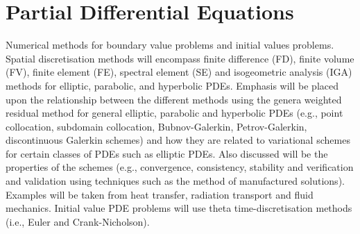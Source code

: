 \chapter{Partial Differential Equations }
Numerical methods for boundary value problems and initial values problems. Spatial discretisation methods will encompass finite difference (FD), finite volume (FV), finite element (FE), spectral element (SE) and isogeometric analysis (IGA) methods for elliptic, parabolic, and hyperbolic PDEs. Emphasis will be placed upon the relationship between the different methods using the genera weighted residual method for general elliptic, parabolic and hyperbolic PDEs (e.g., point collocation, subdomain collocation, Bubnov-Galerkin, Petrov-Galerkin, discontinuous Galerkin schemes) and how they are related to variational schemes for certain classes of PDEs such as elliptic PDEs.  Also discussed will be the properties of the schemes (e.g., convergence, consistency, stability and verification and validation using techniques such as the method of manufactured solutions). Examples will be taken from heat transfer, radiation transport and fluid mechanics. Initial value PDE problems will use theta time-discretisation methods (i.e., Euler and Crank-Nicholson). 
